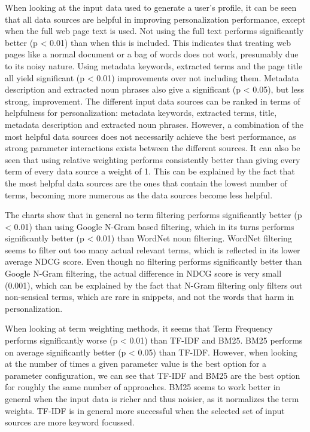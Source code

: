 \documentclass{sig-alternate}
\begin{document}
When looking at the input data used to generate a user's profile, it can be seen that all data sources are helpful in improving personalization performance, except when the full web page text is used. Not using the full text performs significantly better (p < 0.01) than when this is included. This indicates that treating web pages like a normal document or a bag of words does not work, presumably due to its noisy nature. Using metadata keywords, extracted terms and the page title all yield significant (p < 0.01) improvements over not including them. Metadata description and extracted noun phrases also give a significant (p < 0.05), but less strong, improvement. The different input data sources can be ranked in terms of helpfulness for personalization: metadata keywords, extracted terms, title, metadata description and extracted noun phrases. However, a combination of the most helpful data sources does not necessarily achieve the best performance, as strong parameter interactions exists between the different sources. It can also be seen that using relative weighting performs consistently better than giving every term of every data source a weight of 1. This can be explained by the fact that the most helpful data sources are the ones that contain the lowest number of terms, becoming more numerous as the data sources become less helpful.

The charts show that in general no term filtering performs significantly better (p < 0.01) than using Google N-Gram based filtering, which in its turns performs significantly better (p < 0.01) than WordNet noun filtering. WordNet filtering seems to filter out too many actual relevant terms, which is reflected in its lower average NDCG score. Even though no filtering performs significantly better than Google N-Gram filtering, the actual difference in NDCG score is very small (0.001), which can be explained by the fact that N-Gram filtering only filters out non-sensical terms, which are rare in snippets, and not the words that harm in personalization.

When looking at term weighting methods, it seems that Term Frequency performs significantly worse (p < 0.01) than TF-IDF and BM25. BM25 performs on average significantly better (p < 0.05) than TF-IDF. However, when looking at the number of times a given parameter value is the best option for a parameter configuration, we can see that TF-IDF and BM25 are the best option for roughly the same number of approaches. BM25 seems to work better in general when the input data is richer and thus noisier, as it normalizes the term weights. TF-IDF is in general more successful when the selected set of input sources are more keyword focussed.
\end{document}
